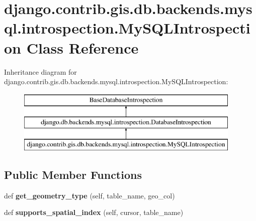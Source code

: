 \hypertarget{classdjango_1_1contrib_1_1gis_1_1db_1_1backends_1_1mysql_1_1introspection_1_1_my_s_q_l_introspection}{}\section{django.\+contrib.\+gis.\+db.\+backends.\+mysql.\+introspection.\+My\+S\+Q\+L\+Introspection Class Reference}
\label{classdjango_1_1contrib_1_1gis_1_1db_1_1backends_1_1mysql_1_1introspection_1_1_my_s_q_l_introspection}
Inheritance diagram for django.\+contrib.\+gis.\+db.\+backends.\+mysql.\+introspection.\+My\+S\+Q\+L\+Introspection\+:\begin{figure}[H]
\begin{center}
\leavevmode
\includegraphics[height=3.000000cm]{classdjango_1_1contrib_1_1gis_1_1db_1_1backends_1_1mysql_1_1introspection_1_1_my_s_q_l_introspection}
\end{center}
\end{figure}
\subsection*{Public Member Functions}
\begin{DoxyCompactItemize}
\item 
\mbox{\label{classdjango_1_1contrib_1_1gis_1_1db_1_1backends_1_1mysql_1_1introspection_1_1_my_s_q_l_introspection_a689b5051b724cba2a40e6f5c7f2149de}} 
def {\bfseries get\+\_\+geometry\+\_\+type} (self, table\+\_\+name, geo\+\_\+col)
\item 
\mbox{\label{classdjango_1_1contrib_1_1gis_1_1db_1_1backends_1_1mysql_1_1introspection_1_1_my_s_q_l_introspection_a4cc82508d31ec6b357bd290dad5d0ae1}} 
def {\bfseries supports\+\_\+spatial\+\_\+index} (self, cursor, table\+\_\+name)
\end{DoxyCompactItemize}
